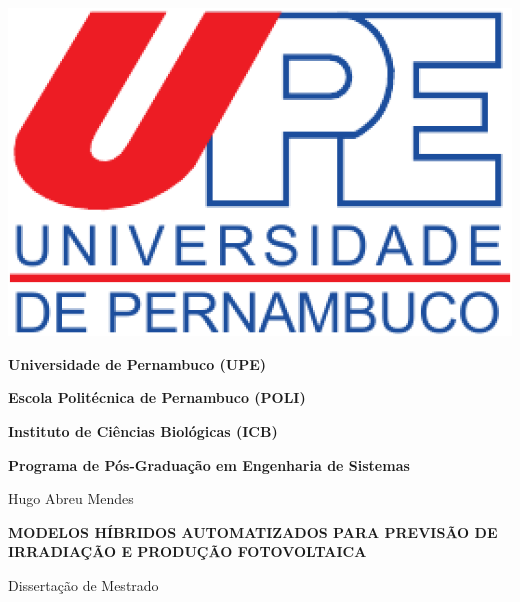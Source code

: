 \begin{center}
\begin{minipage}[b]{0.15\linewidth}
\end{minipage} \hfill
\begin{minipage}[b]{0.15\linewidth}
\includegraphics[width=\textwidth]{Figuras/Capa/upelogo.eps}
\end{minipage}


{\textbf{Universidade de Pernambuco (UPE)}} %

{\textbf{Escola Politécnica de Pernambuco (POLI)}} %

{\textbf{Instituto de Ciências Biológicas (ICB)}} \\ \vspace{1ex}

{\textbf{Programa de Pós-Graduação em Engenharia de Sistemas}} \\ \vspace{1ex}

\vspace{1.0in}

{\Large Hugo Abreu Mendes}

\vspace{1.3in}

{\Large \textbf{MODELOS HÍBRIDOS AUTOMATIZADOS PARA PREVISÃO DE IRRADIAÇÃO E PRODUÇÃO FOTOVOLTAICA}} \\

\vspace{1.4in}

{\large Dissertação de Mestrado}


\vspace{1.6in}


\vspace{18pt}{Recife, Março de 2021.}

\end{center}